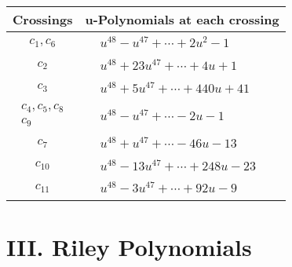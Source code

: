 \documentclass[1p]{elsarticle_modified}
\theoremstyle{definition}
\begin{document}
\begin{tabular}{m{50pt}|m{274pt}}
Crossings & \hspace{64pt}u-Polynomials at each crossing \\
\hline $$\begin{aligned}c_{1},c_{6}\end{aligned}$$&$\begin{aligned}
&u^{48}- u^{47}+\cdots+2 u^2-1
\end{aligned}$\\
\hline $$\begin{aligned}c_{2}\end{aligned}$$&$\begin{aligned}
&u^{48}+23 u^{47}+\cdots+4 u+1
\end{aligned}$\\
\hline $$\begin{aligned}c_{3}\end{aligned}$$&$\begin{aligned}
&u^{48}+5 u^{47}+\cdots+440 u+41
\end{aligned}$\\
\hline $$\begin{aligned}c_{4},c_{5},c_{8}\\c_{9}\end{aligned}$$&$\begin{aligned}
&u^{48}- u^{47}+\cdots-2 u-1
\end{aligned}$\\
\hline $$\begin{aligned}c_{7}\end{aligned}$$&$\begin{aligned}
&u^{48}+u^{47}+\cdots-46 u-13
\end{aligned}$\\
\hline $$\begin{aligned}c_{10}\end{aligned}$$&$\begin{aligned}
&u^{48}-13 u^{47}+\cdots+248 u-23
\end{aligned}$\\
\hline $$\begin{aligned}c_{11}\end{aligned}$$&$\begin{aligned}
&u^{48}-3 u^{47}+\cdots+92 u-9
\end{aligned}$\\
\hline
\end{tabular}\newpage\renewcommand{\arraystretch}{1}
\centering \section*{ III. Riley Polynomials}
\end{document}
